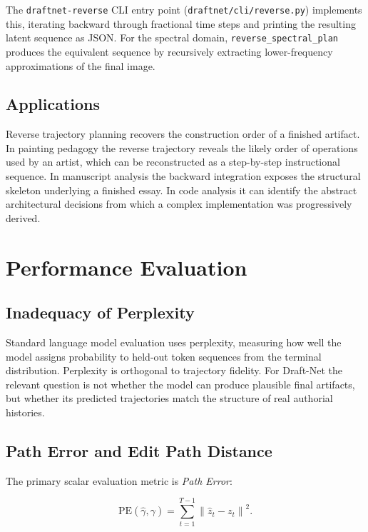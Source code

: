 \documentclass[12pt,a4paper]{article}
\theoremstyle{draftthm}
\newcommand{\traj}{\gamma}
\newcommand{\norm}[1]{\left\|#1\right\|}
\newcommand{\code}[1]{\texttt{\small #1}}
\begin{document}
The \code{draftnet-reverse} CLI entry point (\code{draftnet/cli/reverse.py}) implements this, iterating backward through fractional time steps and printing the resulting latent sequence as JSON. For the spectral domain, \code{reverse\_spectral\_plan} produces the equivalent sequence by recursively extracting lower-frequency approximations of the final image.

\subsection{Applications}

Reverse trajectory planning recovers the construction order of a finished artifact. In painting pedagogy the reverse trajectory reveals the likely order of operations used by an artist, which can be reconstructed as a step-by-step instructional sequence. In manuscript analysis the backward integration exposes the structural skeleton underlying a finished essay. In code analysis it can identify the abstract architectural decisions from which a complex implementation was progressively derived.

\section{Performance Evaluation}

\subsection{Inadequacy of Perplexity}

Standard language model evaluation uses perplexity, measuring how well the model assigns probability to held-out token sequences from the terminal distribution. Perplexity is orthogonal to trajectory fidelity. For Draft-Net the relevant question is not whether the model can produce plausible final artifacts, but whether its predicted trajectories match the structure of real authorial histories.

\subsection{Path Error and Edit Path Distance}

The primary scalar evaluation metric is \emph{Path Error}:

\begin{equation}
  \mathrm{PE}(\hat\traj, \traj)
  =
  \sum_{t=1}^{T-1}
  \norm{\hat{z}_t - z_t}^2.
  \label{eq:path-error}
\end{equation}
\end{document}
